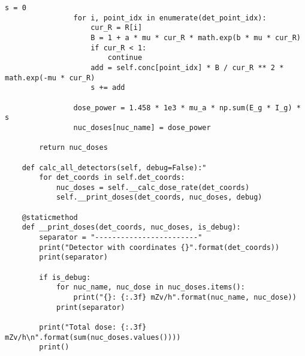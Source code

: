 \begin{lstlisting}[caption=Исходный код модуля расчета мощности эквивалентной дозы внешнего гамма-излучения, 
                    label={lst_dose_calc}, basicstyle=\scriptsize]
                s = 0
                for i, point_idx in enumerate(det_point_idx):
                    cur_R = R[i]
                    B = 1 + a * mu * cur_R * math.exp(b * mu * cur_R)
                    if cur_R < 1:
                        continue
                    add = self.conc[point_idx] * B / cur_R ** 2 * math.exp(-mu * cur_R)
                    s += add

                dose_power = 1.458 * 1e3 * mu_a * np.sum(E_g * I_g) * s
                nuc_doses[nuc_name] = dose_power

        return nuc_doses

    def calc_all_detectors(self, debug=False):"
        for det_coords in self.det_coords:
            nuc_doses = self.__calc_dose_rate(det_coords)
            self.__print_doses(det_coords, nuc_doses, debug)

    @staticmethod
    def __print_doses(det_coords, nuc_doses, is_debug):
        separator = "------------------------"
        print("Detector with coordinates {}".format(det_coords))
        print(separator)

        if is_debug:
            for nuc_name, nuc_dose in nuc_doses.items():
                print("{}: {:.3f} mZv/h".format(nuc_name, nuc_dose))
            print(separator)

        print("Total dose: {:.3f} mZv/h\n".format(sum(nuc_doses.values())))
        print()
\end{lstlisting}


\clearpage